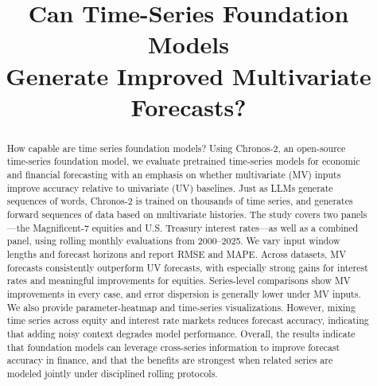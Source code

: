\documentclass[twocolumn]{article}
\begin{document}

\title{Can Time-Series Foundation Models \\Generate Improved Multivariate Forecasts?}

\maketitle


\begin{abstract}
How capable are time series foundation models? Using Chronos-2, an open-source time-series foundation model, we evaluate pretrained time-series models for economic and financial forecasting with an emphasis on whether multivariate (MV) inputs improve accuracy relative to univariate (UV) baselines. Just as LLMs generate sequences of words, Chronos-2 is trained on thousands of time series, and generates forward sequences of data based on multivariate histories. The study covers two panels---the Magnificent-7 equities and U.S. Treasury interest rates---as well as a combined panel, using rolling monthly evaluations from 2000--2025. We vary input window lengths and forecast horizons and report RMSE and MAPE. Across datasets, MV forecasts consistently outperform UV forecasts, with especially strong gains for interest rates and meaningful improvements for equities. Series-level comparisons show MV improvements in every case, and error dispersion is generally lower under MV inputs. We also provide parameter-heatmap and time-series visualizations. However, mixing time series across equity and interest rate markets reduces forecast accuracy, indicating that adding noisy context degrades model performance. Overall, the results indicate that foundation models can leverage cross-series information to improve forecast accuracy in finance, and that the benefits are strongest when related series are modeled jointly under disciplined rolling protocols. 
\end{abstract}
\end{document}
